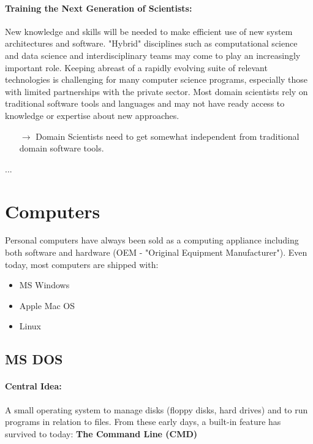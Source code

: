 \documentclass[twocolumn]{article}
\begin{document}
		\paragraph{Training the Next Generation of Scientists:}
			New knowledge and skills will be needed to make efficient use of new system architectures and software. "Hybrid" disciplines such as computational science and data science and interdisciplinary teams may come to play an increasingly important role. Keeping abreast of a rapidly evolving suite of relevant technologies is challenging for many computer science programs, especially those with limited partnerships with the private sector. Most domain scientists rely on traditional software tools and languages and may not have ready access to knowledge or expertise about new approaches.
			\begin{itemize}
			\item[$\rightarrow$] Domain Scientists need to get somewhat independent from traditional domain software tools.
			\end{itemize}
			...
\section{Computers}
	Personal computers have always been sold as a computing appliance including both software and hardware (OEM - "Original Equipment Manufacturer"). Even today, most computers are shipped with:
	\begin{itemize}
	\item MS Windows
	\item Apple Mac OS
	\item Linux
	\end{itemize}
	\subsection{MS DOS}
		\paragraph{Central Idea:}
			 A small operating system to manage disks (floppy disks, hard drives) and to run programs in relation to files. From these early days, a built-in feature has survived to today: \textbf{The Command Line (CMD)}	
\end{document}
